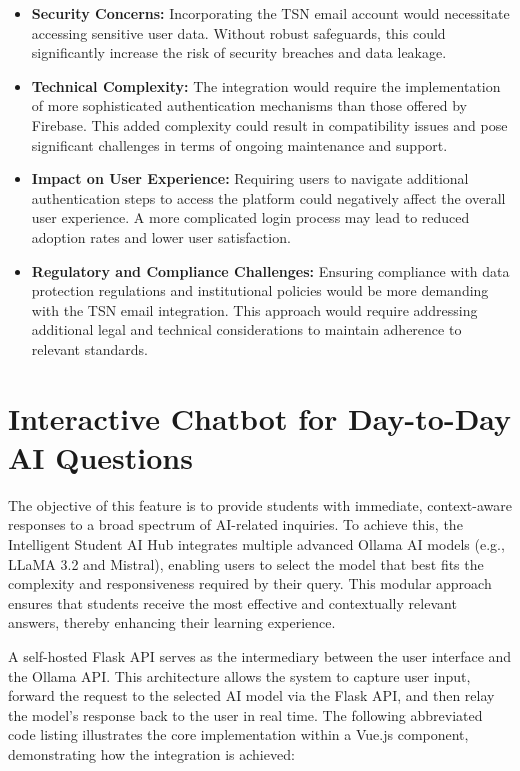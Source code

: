 \begin{itemize}
    \item \textbf{Security Concerns:} Incorporating the TSN email account would necessitate accessing sensitive user data. Without robust safeguards, this could significantly increase the risk of security breaches and data leakage.
    \item \textbf{Technical Complexity:} The integration would require the implementation of more sophisticated authentication mechanisms than those offered by Firebase. This added complexity could result in compatibility issues and pose significant challenges in terms of ongoing maintenance and support.
    \item \textbf{Impact on User Experience:} Requiring users to navigate additional authentication steps to access the platform could negatively affect the overall user experience. A more complicated login process may lead to reduced adoption rates and lower user satisfaction.
    \item \textbf{Regulatory and Compliance Challenges:} Ensuring compliance with data protection regulations and institutional policies would be more demanding with the TSN email integration. This approach would require addressing additional legal and technical considerations to maintain adherence to relevant standards.
\end{itemize}

\section{Interactive Chatbot for Day-to-Day AI Questions}

The objective of this feature is to provide students with immediate, context-aware responses to a broad spectrum of AI-related inquiries. To achieve this, the Intelligent Student AI Hub integrates multiple advanced Ollama AI models (e.g., LLaMA 3.2 and Mistral), enabling users to select the model that best fits the complexity and responsiveness required by their query. This modular approach ensures that students receive the most effective and contextually relevant answers, thereby enhancing their learning experience.

A self-hosted Flask API serves as the intermediary between the user interface and the Ollama API. This architecture allows the system to capture user input, forward the request to the selected AI model via the Flask API, and then relay the model's response back to the user in real time. The following abbreviated code listing illustrates the core implementation within a Vue.js component, demonstrating how the integration is achieved:

